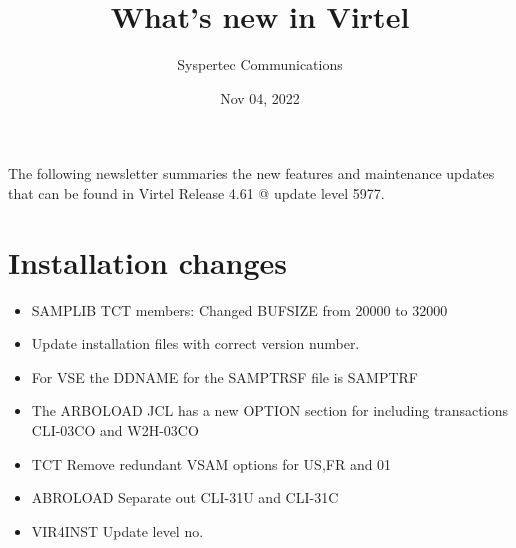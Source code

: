 \documentclass[letterpaper,10pt,english]{sphinxmanual}
\title{What's new in Virtel}
\date{Nov 04, 2022}
\author{Syspertec Communications}
\begin{document}
\pagestyle{empty}
\sphinxmaketitle
\pagestyle{plain}
\sphinxtableofcontents
\pagestyle{normal}
\label{\detokenize{TN202101::doc}}


The following newsletter summaries the new features and maintenance updates that can be found in Virtel Release 4.61 @ update level 5977.


\chapter{Installation changes}
\label{\detokenize{TN202101:installation-changes}}
\begin{itemize}
\item {} 
SAMPLIB TCT members: Changed BUFSIZE from 20000 to 32000

\end{itemize}

\begin{itemize}
\item {} 
Update installation files with correct version number.

\end{itemize}

\begin{itemize}
\item {} 
For VSE the DDNAME for the SAMPTRSF file is SAMPTRF

\end{itemize}

\begin{itemize}
\item {} 
The ARBOLOAD JCL has a new OPTION section for including transactions CLI-03CO and W2H-03CO

\end{itemize}

\begin{itemize}
\item {} 
TCT                           Remove redundant VSAM options for US,FR and 01

\item {} 
ABROLOAD                  Separate out CLI-31U and CLI-31C

\item {} 
VIR4INST                  Update level no.

\end{itemize}
\end{document}
